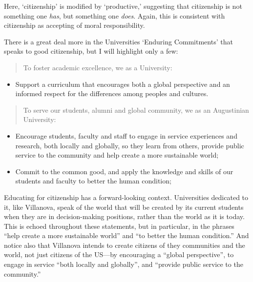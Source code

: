 Here, `citizenship' is modified by `productive,' suggesting that citizenship is not something one \emph{has}, but something one \emph{does}. Again, this is consistent with citizenship as accepting of moral responsibility.

There is a great deal more in the Universities `Enduring Commitments' that speaks to good citizenship, but I will highlight only a few:

\begin{quote}

To foster academic excellence, we as a University:
\end{quote}

\begin{itemize}
\item Support a curriculum that encourages both a global perspective and an informed respect for the differences among peoples and cultures.

\end{itemize}

\begin{quote}

To serve our students, alumni and global community, we as an Augustinian University:
\end{quote}

\begin{itemize}
\item Encourage students, faculty and staff to engage in service experiences and research, both locally and globally, so they learn from others, provide public service to the community and help create a more sustainable world;

\item Commit to the common good, and apply the knowledge and skills of our students and faculty to better the human condition;

\end{itemize}

Educating for citizenship has a forward-looking context. Universities dedicated to it, like Villanova, speak of the world that will be created by its current students when they are in decision-making positions, rather than the world as it is today. This is echoed throughout these statements, but in particular, in the phrases ``help create a more sustainable world'' and ``to better the human condition.'' And notice also that Villanova intends to create citizens of they communities and the world, not just citizens of the US---by encouraging a ``global perspective'', to engage in service ``both locally and globally'', and ``provide public service to the community.''

